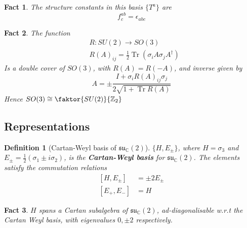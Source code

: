 \documentclass{article}
\newtheorem{definition}{Definition}[subsection]
\newtheorem{fact}{Fact}[subsection]
\DeclareMathOperator{\tr}{Tr}
\newcommand{\bam}[1]{\textbf{#1}}
\newcommand{\mf}[1]{\mathfrak{#1}}
\newcommand{\mbb}[1]{\mathbb{#1}}
\newcommand{\comm}[2][]{\left[ #1, #2 \right]}
\begin{document}
\begin{fact}
The structure constants in this basis $\lbrace T^a \rbrace$ are 
\[
f^{ab}_c=\epsilon_{abc}
\]
\end{fact}

\begin{fact}
The function 
\begin{align*}
     & R : SU(2) \to SO(3) \\
     & R(A)_{ij} = \frac{1}{2}\tr\left( \sigma_i A \sigma_j A^\dagger \right)
\end{align*}
Is a double cover of $SO(3)$, with $R(A)=R(-A)$, and inverse given by 
\[
A=\pm \frac{I+\sigma_i R(A)_{ij} \sigma_j}{2\sqrt{1+\tr R(A)}}
\]
Hence $SO(3)\cong\faktor{SU(2)}{\mbb{Z}_2}$
\end{fact}

\subsection{Representations}

\begin{definition}[Cartan-Weyl basis of $\mf{su}_\mbb{C}(2)$]
$\lbrace H, E_\pm \rbrace$, where $H=\sigma_3$ and $E_\pm=\frac{1}{2}(\sigma_1\pm i\sigma_2 )$, is the \bam{Cartan-Weyl basis} for $\mf{su}_\mbb{C}(2)$. The elements satisfy the commutation relations 
\begin{align*}
\comm[H]{E_\pm} &= \pm 2E_\pm \\
\comm[E_+]{E_-} &= H
\end{align*}
\end{definition} 

\begin{fact}
$H$ spans a Cartan subalgebra of $\mf{su}_\mbb{C}(2)$, ad-diagonalisable w.r.t the Cartan Weyl basis, with eigenvalues $0, \pm 2$ respectively. 
\end{fact}
\end{document}
